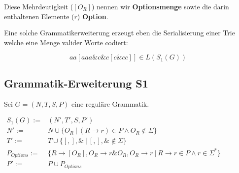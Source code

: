 \documentclass[a4paper,12pt]{report}
\begin{document}
Diese Mehrdeutigkeit ($[O_R]$) nennen wir \textbf{Optionsmenge} sowie die darin enthaltenen Elemente ($r$) \textbf{Option}. 

Eine solche Grammatikerweiterung erzeugt eben die Serialisierung einer Trie welche eine Menge valider Worte codiert:

\[ aa[aaa\&c\&c[c\&cc]]\in L(S_1(G))\]

\subsection*{Grammatik-Erweiterung S1}

Sei $G = (N,T,S,P)$ eine reguläre Grammatik.

$
\begin{array}{rl}
  S_1(G) :=& (N', T', S, P') \\
  N' :=& N \cup \{ O_R\ |\ (R\rightarrow r)\in P\land O_R \notin \Sigma\}\\
  T' :=& T \cup \{[ , ], \&\ |\ [,],\&\notin \Sigma \}\\
  P_{Options} :=& \{R \rightarrow [O_R], O_R \rightarrow r\& O_R, O_R \rightarrow r \ \vert\ R\rightarrow r\in P \land r\in \Sigma^*\} \\
  P' :=& P \cup P_{Options} 
\end{array}
$
\end{document}
